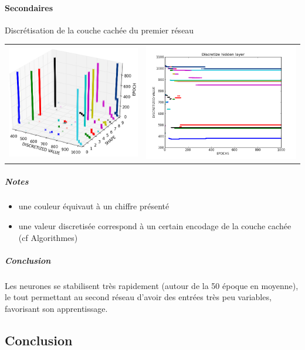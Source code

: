 \documentclass[a4paper,12pt]{article}
\begin{document}
      \paragraph*{Secondaires}
	Discrétisation de la couche cachée du premier réseau
      	\begin{center}
	  \begin{tabular}{lr}
	    \hspace*{-1cm}
	    \includegraphics[width=250px]{../cleeremans_2007/digit_reco/discretize_cloud.png}
	    &
	    \hspace*{-1cm}
	    \includegraphics[width=290px]{../cleeremans_2007/digit_reco/discretize.png} 
	  \end{tabular}
	\end{center} 
	\subparagraph*{Notes}
	  \begin{itemize}
	    \item une couleur équivaut à un chiffre présenté
	    \item une valeur discretisée correspond à un certain encodage de la couche cachée (cf Algorithmes)
	  \end{itemize}
	\subparagraph*{Conclusion}
	  Les neurones se stabilisent très rapidement (autour de la 50 époque en moyenne), 
	  le tout permettant au second réseau d'avoir des entrées très peu variables, favorisant
	  son apprentissage.
	  


    \subsection*{Conclusion}
    
\end{document}
